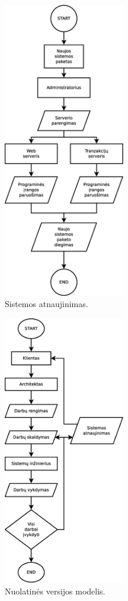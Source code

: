 \documentclass[10pt]{IEEEtran}
\begin{document}
            \begin{figure}[t]
                \centering
                \includegraphics[width=200px]{figures/sistemos_atnaujinimas.eps}
                \caption{Sistemos atnaujinimas.}
                \label{fig:sistemos_atnaujinimas}
            \end{figure}

            \begin{figure}[t]
                \centering
                \includegraphics[width=200px]{figures/nuolatines_versijos_modelis.eps}
                \caption{Nuolatinės versijos modelis.}
                \label{fig:nuolatines_versijos_modelis}
            \end{figure}
\end{document}
